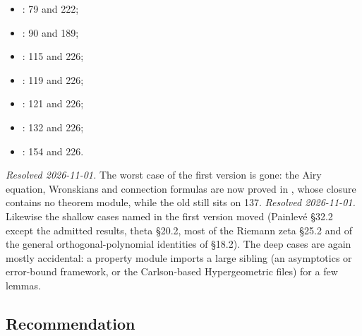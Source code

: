 \documentclass[11pt,a4paper]{article}
\newcommand{\resolved}[1]{\textit{Resolved #1.}}
\begin{document}
\begin{RaggedRight}
\begin{itemize}
\begin{itemize}
      \item {}: 79 and 222;
      \item {}: 90 and 189;
      \item {}: 115 and 226;
      \item {}: 119 and 226;
      \item {}: 121 and 226;
      \item {}: 132 and 226;
      \item {}: 154
        and 226.
    \end{itemize}
\end{itemize}
\end{RaggedRight}
\resolved{2026-11-01} The worst case of the first version is gone: the Airy equation,
Wronskians and connection formulas are now proved in , whose
closure contains no theorem module, while the old  still sits on 137.
\resolved{2026-11-01} Likewise the shallow cases named in the first version moved (Painlev\'e
\S32.2 except the admitted results, theta \S20.2, most of the Riemann zeta \S25.2 and of the
general orthogonal-polynomial identities of \S18.2). The deep cases are again mostly
accidental: a property module imports a large sibling (an asymptotics or error-bound framework,
or the Carlson-based Hypergeometric files) for a few lemmas.

\subsection{Recommendation}
\end{document}
